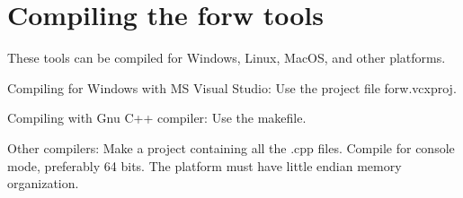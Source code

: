 \documentclass[forwardcom.tex]{subfiles}
\begin{document}
\section{Compiling the forw tools} \label{compilingForw}

These tools can be compiled for Windows, Linux, MacOS, and other platforms.
\vspace{2mm}

Compiling for Windows with MS Visual Studio: Use the project file forw.vcxproj.

Compiling with Gnu C++ compiler: Use the makefile.

Other compilers: Make a project containing all the .cpp files. Compile for console mode, preferably 64 bits. The platform must have little endian memory organization.
\end{document}
